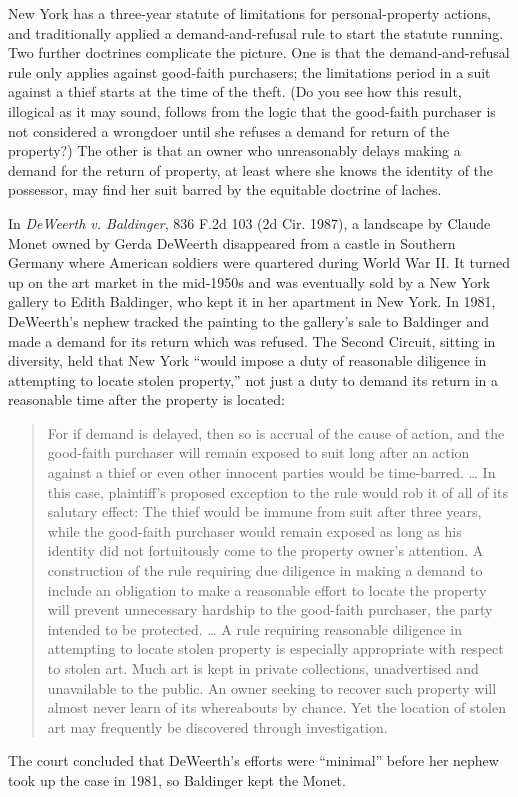 

New York has a three-year statute of limitations
for personal-property actions, and traditionally applied a demand-and-refusal
rule to start the statute running. Two further doctrines complicate the
picture. One is that the demand-and-refusal rule only applies against
good-faith purchasers; the limitations period in a suit against a thief starts
at the time of the theft. (Do you see how this result, illogical as it may
sound, follows from the logic that the good-faith purchaser is not
considered a wrongdoer until she refuses a demand for return of the property?)
The other is that an owner who unreasonably delays making a demand for the
return of property, at least where she knows the identity of the possessor, may
find her suit barred by the equitable doctrine of laches.

In \textit{DeWeerth v. Baldinger}, 836 F.2d 103 (2d Cir. 1987), a landscape by
Claude Monet owned by Gerda DeWeerth disappeared from a castle in Southern
Germany where American soldiers were quartered during World War II. It turned
up on the art market in the mid-1950s and was eventually sold by a New York
gallery to Edith Baldinger, who kept it in her apartment in New York. In 1981,
DeWeerth's nephew tracked the painting to the gallery's sale to Baldinger and
made a demand for its return which was refused. The Second Circuit, sitting in
diversity, held that New York ``would impose a duty of reasonable diligence in
attempting to locate stolen property,'' not just a duty to demand its return in
a reasonable time after the property is located:
\begin{quote}
For if demand is delayed, then so is accrual of the cause of action, and the
good-faith purchaser will remain exposed to suit long after an action against a
thief or even other innocent parties would be time-barred. \dots{} In this
case, plaintiff's proposed exception to the rule would rob it of all of its
salutary effect: The thief would be immune from suit after three years, while
the good-faith purchaser would remain exposed as long as his identity did not
fortuitously come to the property owner's attention. A construction of the rule
requiring due diligence in making a demand to include an obligation to make a
reasonable effort to locate the property will prevent unnecessary hardship to
the good-faith purchaser, the party intended to be protected. \dots{} A rule
requiring reasonable diligence in attempting to locate stolen property is
especially appropriate with respect to stolen art. Much art is kept in private
collections, unadvertised and unavailable to the public. An owner seeking to
recover such property will almost never learn of its whereabouts by chance. Yet
the location of stolen art may frequently be discovered through investigation.
\end{quote}
The court concluded that DeWeerth's efforts were ``minimal'' before her nephew
took up the case in 1981, so Baldinger kept the Monet.

